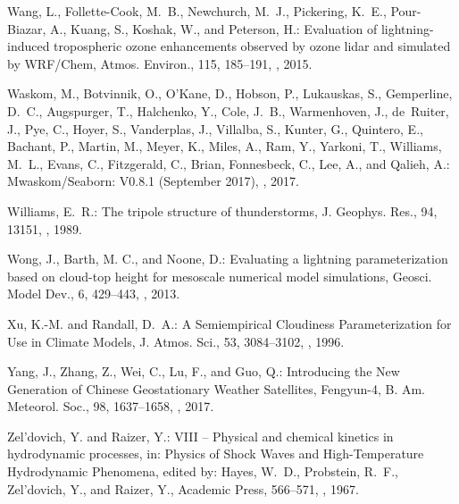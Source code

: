 \documentclass[amt]{copernicus}
\begin{document}
\begin{thebibliography}{105}
Wang, L., Follette-Cook, M.~B., Newchurch, M.~J., Pickering, K.~E.,
  Pour-Biazar, A., Kuang, S., Koshak, W., and Peterson, H.: Evaluation of
  lightning-induced tropospheric ozone enhancements observed by ozone lidar and
  simulated by WRF/Chem, Atmos. Environ., 115, 185--191,
  , 2015.

Waskom, M., Botvinnik, O., O'Kane, D., Hobson, P., Lukauskas, S., Gemperline,
  D.~C., Augspurger, T., Halchenko, Y., Cole, J.~B., Warmenhoven, J.,
  de~Ruiter, J., Pye, C., Hoyer, S., Vanderplas, J., Villalba, S., Kunter, G.,
  Quintero, E., Bachant, P., Martin, M., Meyer, K., Miles, A., Ram, Y.,
  Yarkoni, T., Williams, M.~L., Evans, C., Fitzgerald, C., Brian, Fonnesbeck,
  C., Lee, A., and Qalieh, A.: Mwaskom/Seaborn: V0.8.1 (September 2017),
  , 2017.

Williams, E.~R.: The tripole structure of thunderstorms, J. Geophys.
  Res., 94, 13151, , 1989.

Wong, J., Barth, M. C., and Noone, D.: Evaluating a lightning parameterization based on cloud-top height for mesoscale numerical model simulations, Geosci. Model Dev., 6, 429–443, , 2013.

Xu, K.-M. and Randall, D.~A.: A Semiempirical Cloudiness Parameterization for
  Use in Climate Models, J. Atmos. Sci., 53, 3084--3102,
  , 1996.

Yang, J., Zhang, Z., Wei, C., Lu, F., and Guo, Q.: Introducing the New
  Generation of Chinese Geostationary Weather Satellites, Fengyun-4, B.
Am. Meteorol. Soc., 98, 1637--1658,
  , 2017.

Zel'dovich, Y. and Raizer, Y.: VIII -- Physical and chemical kinetics in
  hydrodynamic processes, in: Physics of Shock Waves and High-Temperature
  Hydrodynamic Phenomena, edited by: Hayes, W.~D., Probstein, R.~F., Zel'dovich,
  Y., and Raizer, Y., {Academic Press}, 566--571,
  , 1967.


\end{thebibliography}
\end{document}
